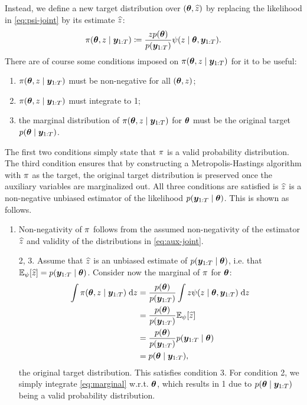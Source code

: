 Instead, we define a new target distribution over $(\bm{\theta}, \widehat{z})$ by replacing the likelihood in \eqref{eq:psi-joint} by its estimate $\widehat{z}$:
\begin{equation} \label{eq:aux-joint}
\pi(\bm{\theta}, z \mid \bm{y}_{1:T}) \coloneqq \frac{z p(\bm{\theta})}{p(\bm{y}_{1:T})} \psi(z \mid \bm{\theta}, \bm{y}_{1:T}).
\end{equation}
There are of course some conditions imposed on $\pi(\bm{\theta}, z \mid \bm{y}_{1:T})$ for it to be useful:
\begin{enumerate}
    \item $\pi(\bm{\theta}, z \mid \bm{y}_{1:T})$ must be non-negative for all $(\bm{\theta}, z)$;
    \item $\pi(\bm{\theta}, z \mid \bm{y}_{1:T})$ must integrate to 1;
    \item the marginal distribution of $\pi(\bm{\theta}, z \mid \bm{y}_{1:T})$ for $\bm{\theta}$ must be the original target $p(\bm{\theta} \mid \bm{y}_{1:T})$.
\end{enumerate}
The first two conditions simply state that $\pi$ is a valid probability distribution. The third condition ensures that by constructing a Metropolis-Hastings algorithm with $\pi$ as the target, the original target distribution is preserved once the auxiliary variables are marginalized out. All three conditions are satisfied is $\widehat{z}$ is a non-negative unbiased estimator of the likelihood $p(\bm{y}_{1:T} \mid \bm{\theta})$. This is shown as follows.

\begin{enumerate}[align=left]
    \item Non-negativity of $\pi$ follows from the assumed non-negativity of the estimator $\widehat{z}$ and validity of the distributions in \eqref{eq:aux-joint}.
    \item[2, 3.] Assume that $\widehat{z}$ is an unbiased estimate of $p(\bm{y}_{1:T} \mid \bm{\theta})$, i.e. that $\mathbb{E}_{\psi}[\widehat{z}] = p(\bm{y}_{1:T} \mid \bm{\theta})$. Consider now the marginal of $\pi$ for $\bm{\theta}$:
    \begin{equation} \label{eq:marginal}
    \begin{split}
    \int \pi(\bm{\theta}, z \mid \bm{y}_{1:T})\; \mathrm{d}{z} & = \frac{p(\bm{\theta})}{p(\bm{y}_{1:T})} \int z \psi(z \mid \bm{\theta}, \bm{y}_{1:T}) \; \mathrm{d}{z} \\
    & = \frac{p(\bm{\theta})}{p(\bm{y}_{1:T})} \mathbb{E}_{\psi}[\widehat{z}] \\
    & = \frac{p(\bm{\theta})}{p(\bm{y}_{1:T})} p(\bm{y}_{1:T} \mid \bm{\theta}) \\
    & = p(\bm{\theta} \mid \bm{y}_{1:T}),
    \end{split}
    \end{equation}
    the original target distribution. This satisfies condition 3. For condition 2, we simply integrate \eqref{eq:marginal} w.r.t. $\bm{\theta}$, which results in 1 due to $p(\bm{\theta} \mid \bm{y}_{1:T})$ being a valid probability distribution.
\end{enumerate}
